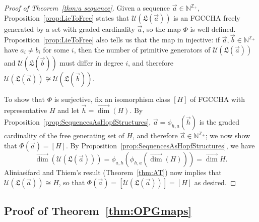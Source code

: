 \documentclass[11pt]{amsart}
\theoremstyle{definition}
\numberwithin{equation}{section}
\def\NN{{\mathbb N}}
\def\ZZ{{\mathbb Z}}
\newcommand{\FGCCHA}{\textsf{FGCCHA}\xspace}
\newcommand{\vecdim}{\overrightarrow{\dim}}
\begin{document}
\begin{proof}[Proof of Theorem~\ref{thm:a sequence}]
Given a sequence $\vec{a} \in \NN^{\ZZ_+}$, Proposition~\ref{prop:LieToFree} states that
$\mathcal{U}(\mathfrak{L}(\vec{a}))$ is an \FGCCHA freely generated by a set with graded
cardinality $\vec{a}$, so the map $\Phi$ is well defined.
Proposition~\ref{prop:LieToFree} also tells us that the map in injective: if $\vec{a}, \vec{b}  \in \NN^{\ZZ_+}$ have $a_{i} \neq b_{i}$ for some $i$, then the number of primitive generators of $\mathcal{U}(\mathfrak{L}(\vec{a}))$ and $\mathcal{U}(\mathfrak{L}(\vec{b}))$ must differ in degree $i$, and therefore $\mathcal{U}(\mathfrak{L}(\vec{a})) \not\cong \mathcal{U}(\mathfrak{L}(\vec{b}))$.


To show that $\Phi$ is surjective, fix an isomorphism class $[H]$ of \FGCCHA with representative $H$ and let $\vec{h} = \vecdim(H)$.
By Proposition~\ref{prop:SequencesAsHopfStructures}, $\vec{a} = \phi_{h, a}(\vec{h})$ is the graded cardinality of the free generating set of $H$, and therefore $\vec{a} \in \mathbb{N}^{\mathbb{Z}_{+}}$; we now show that $\Phi(\vec{a}) = [H]$.  
By Proposition~\ref{prop:SequencesAsHopfStructures}, we have
\[
\vecdim(\mathcal{U}(\mathfrak{L}(\vec{a}))) = \phi_{a, h}( \phi_{h, a}(\vecdim(H))) = \vecdim{H}.
\]
Aliniaeifard and Thiem's result (Theorem~\ref{thm:AT}) now implies that $\mathcal{U}(\mathfrak{L}(\vec{a})) \cong H$, so that $\Phi(\vec{a}) = [\mathcal{U}(\mathfrak{L}(\vec{a}))] = [H]$ as desired.  
\end{proof}


\subsection{Proof of Theorem~\ref{thm:OPGmaps}}
\label{sec:OPGproof}
\end{document}
